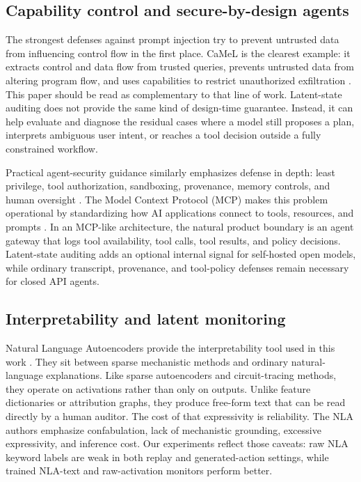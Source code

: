 \documentclass{article}
\begin{document}
\subsection{Capability control and secure-by-design agents}

The strongest defenses against prompt injection try to prevent untrusted data from influencing control flow in the first place. CaMeL is the clearest example: it extracts control and data flow from trusted queries, prevents untrusted data from altering program flow, and uses capabilities to restrict unauthorized exfiltration \citep{camel2025}. This paper should be read as complementary to that line of work. Latent-state auditing does not provide the same kind of design-time guarantee. Instead, it can help evaluate and diagnose the residual cases where a model still proposes a plan, interprets ambiguous user intent, or reaches a tool decision outside a fully constrained workflow.

Practical agent-security guidance similarly emphasizes defense in depth: least privilege, tool authorization, sandboxing, provenance, memory controls, and human oversight \citep{owasp2026agentsecurity,nist2026caisi}. The Model Context Protocol (MCP) makes this problem operational by standardizing how AI applications connect to tools, resources, and prompts \citep{mcp2026}. In an MCP-like architecture, the natural product boundary is an agent gateway that logs tool availability, tool calls, tool results, and policy decisions. Latent-state auditing adds an optional internal signal for self-hosted open models, while ordinary transcript, provenance, and tool-policy defenses remain necessary for closed API agents.

\subsection{Interpretability and latent monitoring}

Natural Language Autoencoders provide the interpretability tool used in this work \citep{anthropic2026nla}. They sit between sparse mechanistic methods and ordinary natural-language explanations. Like sparse autoencoders and circuit-tracing methods, they operate on activations rather than only on outputs. Unlike feature dictionaries or attribution graphs, they produce free-form text that can be read directly by a human auditor. The cost of that expressivity is reliability. The NLA authors emphasize confabulation, lack of mechanistic grounding, excessive expressivity, and inference cost. Our experiments reflect those caveats: raw NLA keyword labels are weak in both replay and generated-action settings, while trained NLA-text and raw-activation monitors perform better.
\end{document}
